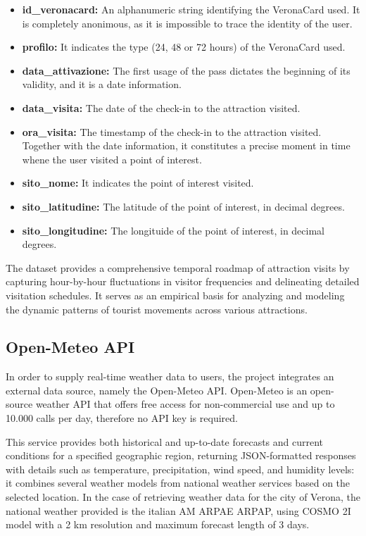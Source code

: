 \begin{itemize}
    \item \textbf{id\_veronacard:} An alphanumeric string identifying the VeronaCard used. It is completely anonimous, as it is impossible to trace the identity of the user.
    \item \textbf{profilo:} It indicates the type (24, 48 or 72 hours) of the VeronaCard used.
    \item \textbf{data\_attivazione:} The first usage of the pass dictates the beginning of its validity, and it is a date information.
    \item \textbf{data\_visita:} The date of the check-in to the attraction visited.
    \item \textbf{ora\_visita:} The timestamp of the check-in to the attraction visited. Together with the date information, it constitutes a precise moment in time whene the user visited a point of interest.
    \item \textbf{sito\_nome:} It indicates the point of interest visited.
    \item \textbf{sito\_latitudine:} The latitude of the point of interest, in decimal degrees.
    \item \textbf{sito\_longitudine:} The longituide of the point of interest, in decimal degrees.
\end{itemize}

The dataset provides a comprehensive temporal roadmap of attraction visits by capturing hour-by-hour fluctuations in visitor frequencies and delineating detailed visitation schedules. It serves as an empirical basis for analyzing and modeling the dynamic patterns of tourist movements across various attractions.


\subsection{Open-Meteo API}
\label{sec:open-meteo}

In order to supply real-time weather data to users, the project integrates an external data source, namely the Open-Meteo API. Open-Meteo is an open-source weather API that offers free access for non-commercial use and up to 10.000 calls per day, therefore no API key is required. \cite{openmeteo}

This service provides both historical and up-to-date forecasts and current conditions for a specified geographic region, returning JSON-formatted responses with details such as temperature, precipitation, wind speed, and humidity levels: it combines several weather models from national weather services based on the selected location. In the case of retrieving weather data for the city of Verona, the national weather provided is the italian AM ARPAE ARPAP, using COSMO 2I model with a 2 km resolution and maximum forecast length of 3 days.

